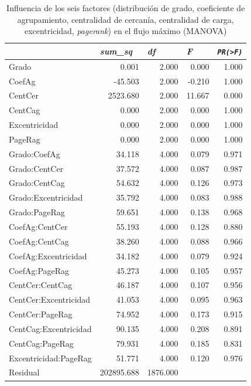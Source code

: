 \documentclass{article}
\begin{document}
\begin{table}[htbp]
  \centering
  \caption{Influencia de los seis factores (distribución de grado, coeficiente de agrupamiento, centralidad de cercanía, centralidad de carga, excentricidad, \textit{pagerank}) en el flujo máximo (MANOVA)}
    \begin{tabular}{lrrrr}
    \toprule
          & \multicolumn{1}{l}{\textit{\textbf{sum\_sq}}} & \multicolumn{1}{l}{\textit{\textbf{df}}} & \multicolumn{1}{l}{\textit{\textbf{F}}} & \multicolumn{1}{l}{\textit{\textbf{\texttt{PR(>F)}}}} \\
    \midrule
    Grado & 0.001 & 2.000 & 0.000 & 1.000 \\
    CoefAg & -45.503 & 2.000 & -0.210 & 1.000 \\
    CentCer & 2523.680 & 2.000 & 11.667 & 0.000 \\
    CentCag & 0.000 & 2.000 & 0.000 & 1.000 \\
    Excentricidad & 0.000 & 2.000 & 0.000 & 1.000 \\
    PageRag & 0.000 & 2.000 & 0.000 & 1.000 \\
    Grado:CoefAg & 34.118 & 4.000 & 0.079 & 0.971 \\
    Grado:CentCer & 37.572 & 4.000 & 0.087 & 0.987 \\
    Grado:CentCag & 54.632 & 4.000 & 0.126 & 0.973 \\
    Grado:Excentricidad & 35.792 & 4.000 & 0.083 & 0.988 \\
    Grado:PageRag & 59.651 & 4.000 & 0.138 & 0.968 \\
    CoefAg:CentCer & 55.193 & 4.000 & 0.128 & 0.880 \\
    CoefAg:CentCag & 38.260 & 4.000 & 0.088 & 0.966 \\
    CoefAg:Excentricidad & 34.182 & 4.000 & 0.079 & 0.924 \\
    CoefAg:PageRag & 45.273 & 4.000 & 0.105 & 0.957 \\
    CentCer:CentCag & 46.187 & 4.000 & 0.107 & 0.956 \\
    CentCer:Excentricidad & 41.053 & 4.000 & 0.095 & 0.963 \\
    CentCer:PageRag & 74.952 & 4.000 & 0.173 & 0.915 \\
    CentCag:Excentricidad & 90.135 & 4.000 & 0.208 & 0.891 \\
    CentCag:PageRag & 79.931 & 4.000 & 0.185 & 0.831 \\
    Excentricidad:PageRag & 51.771 & 4.000 & 0.120 & 0.976 \\
    Residual & 202895.688 & 1876.000 &       &  \\
    \bottomrule
    \end{tabular}%
  \label{tab:t33}%
\end{table}%
 
\end{document}
